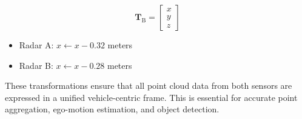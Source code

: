 \[
\mathbf{T}_{\text{B}} = 
\begin{bmatrix}
x \\
y \\
z
\end{bmatrix}
\]
\begin{itemize}
    \item Radar A: $x \leftarrow x - 0.32$ meters
    \item Radar B: $x \leftarrow x - 0.28$ meters
\end{itemize}

These transformations ensure that all point cloud data from both sensors are expressed in a unified vehicle-centric frame. 
This is essential for accurate point aggregation, ego-motion estimation, and object detection.

